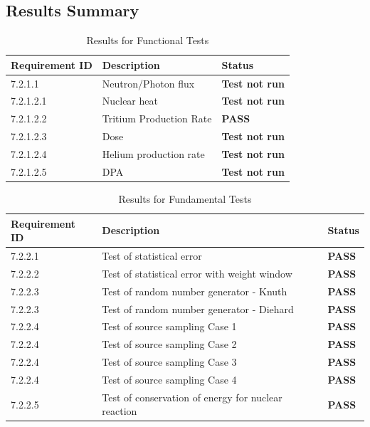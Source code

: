 \documentclass[11pt,a4paper]{article}
\begin{document}
\subsection{Results Summary}

\begin{longtable}{lll}
  \caption{Results for Functional Tests}
  \label{tab:func_res} \\
  \toprule
  Requirement ID & Description & Status \\
  \midrule
  
  7.2.1.1 & Neutron/Photon flux & \textbf{ Test not run } \\
  
  7.2.1.2.1 & Nuclear heat & \textbf{ Test not run } \\
  
  7.2.1.2.2 & Tritium Production Rate & \textbf{ PASS } \\
  
  7.2.1.2.3 & Dose & \textbf{ Test not run } \\
  
  7.2.1.2.4 & Helium production rate & \textbf{ Test not run } \\
  
  7.2.1.2.5 & DPA & \textbf{ Test not run } \\
  
  \bottomrule
\end{longtable}

\begin{longtable}{lll}
  \caption{Results for Fundamental Tests}
  \label{tab:fund_res} \\
\toprule
Requirement ID & Description & Status \\
\midrule

7.2.2.1 & Test of statistical error & \textbf{ PASS } \\

7.2.2.2 & Test of statistical error with weight window & \textbf{ PASS } \\

7.2.2.3 & Test of random number generator - Knuth & \textbf{ PASS } \\

7.2.2.3 & Test of random number generator - Diehard & \textbf{ PASS } \\

7.2.2.4  & Test of source sampling Case 1 & \textbf{ PASS } \\

7.2.2.4 & Test of source sampling Case 2 & \textbf{ PASS } \\

7.2.2.4 & Test of source sampling Case 3 & \textbf{ PASS } \\

7.2.2.4 & Test of source sampling Case 4 & \textbf{ PASS } \\

7.2.2.5 & Test of conservation of energy for nuclear reaction & \textbf{ PASS } \\

\bottomrule
\end{longtable}
\end{document}
